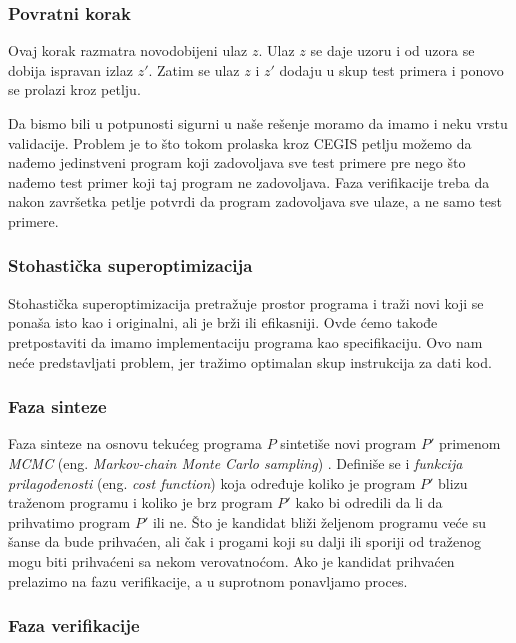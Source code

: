 \subsubsection*{Povratni korak}

Ovaj korak razmatra novodobijeni ulaz $z$. Ulaz $z$ se daje uzoru i od uzora se dobija ispravan izlaz $z'$. Zatim se ulaz $z$ i $z'$ dodaju u skup test primera i ponovo se prolazi kroz petlju.

Da bismo bili u potpunosti sigurni u naše rešenje moramo da imamo i neku vrstu validacije. Problem je to što tokom prolaska kroz CEGIS petlju možemo da nađemo jedinstveni program koji zadovoljava sve test primere pre nego što nađemo test primer koji taj program ne zadovoljava. Faza verifikacije treba da nakon završetka petlje potvrdi da program zadovoljava sve ulaze, a ne samo test primere.


\subsubsection{Stohastička superoptimizacija}
\label{subsec:StohastickaSuperoptimizacija}

Stohastička superoptimizacija pretražuje prostor programa i traži novi koji se ponaša isto kao i originalni, ali je brži ili efikasniji. Ovde ćemo takođe pretpostaviti da imamo implementaciju programa kao specifikaciju. Ovo nam neće predstavljati problem, jer tražimo optimalan skup instrukcija za dati kod.


\subsubsection*{Faza sinteze}


Faza sinteze na osnovu tekućeg programa $P$ sintetiše novi program $P'$ primenom \emph{MCMC} (eng. \emph{Markov-chain Monte Carlo sampling}) \cite{MCMC}. Definiše se i \emph{funkcija prilagođenosti} (eng. \emph{cost function}) koja određuje koliko je program $P'$ blizu traženom programu i koliko je brz program $P'$ kako bi odredili da li da prihvatimo program $P'$ ili ne. Što je kandidat bliži željenom programu veće su šanse da bude prihvaćen, ali čak i progami koji su dalji ili sporiji od traženog mogu biti prihvaćeni sa nekom verovatnoćom. Ako je kandidat prihvaćen prelazimo na fazu verifikacije, a u suprotnom ponavljamo proces.


\subsubsection*{Faza verifikacije}


